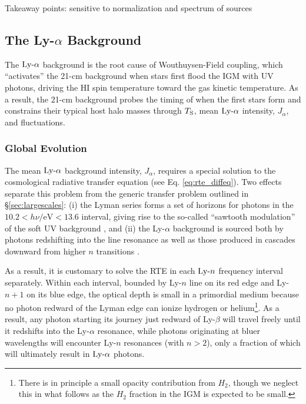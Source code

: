 {\color{red} Takeaway points: sensitive to normalization and spectrum of sources}

\subsection{The Ly-$\alpha$ Background}
The $\text{Ly-}\alpha$ background is the root cause of Wouthuysen-Field coupling, which  ``activates'' the 21-cm background when stars first flood the IGM with UV photons, driving the HI spin temperature toward the gas kinetic temperature. As a result, the 21-cm background probes the timing of when the first stars form and constrains their typical host halo masses through $T_{\text{S}}$, mean $\text{Ly-}\alpha$ intensity, $J_{\alpha}$, and fluctuations.


\subsubsection{Global Evolution} \label{sec:lya_global}
The mean $\text{Ly-}\alpha$ background intensity, $J_{\alpha}$, requires a special solution to the cosmological radiative transfer equation (see Eq. \ref{eq:rte_diffeq}). Two effects separate this problem from the generic transfer problem outlined in \S\ref{sec:largescales}: (i) the Lyman series forms a set of horizons for photons in the $10.2 < h \nu / \mathrm{eV} < 13.6$ interval, giving rise to the so-called ``sawtooth modulation'' of the soft UV background \cite{Haiman1997}, and (ii) the Ly-$\alpha$ background is sourced both by photons redshifting into the line resonance as well as those produced in cascades downward from higher $n$ transitions \cite{Pritchard2006}.

As a result, it is customary to solve the RTE in each $\text{Ly-}n$ frequency interval separately. Within each interval, bounded by Ly-$n$ line on its red edge and Ly-$n+1$ on its blue edge, the optical depth is small in a primordial medium because no photon redward of the Lyman edge can ionize hydrogen or helium\footnote{There is in principle a small opacity contribution from $H_2$, though we neglect this in what follows as the $H_2$ fraction in the IGM is expected to be small.}. As a result, any photon starting its journey just redward of Ly-$\beta$ will travel freely until it redshifts into the Ly-$\alpha$ resonance, while photons originating at bluer wavelengths will encounter Ly-$n$ resonances (with $n>2$), only a fraction of which will ultimately result in $\text{Ly-}\alpha$ photons.

